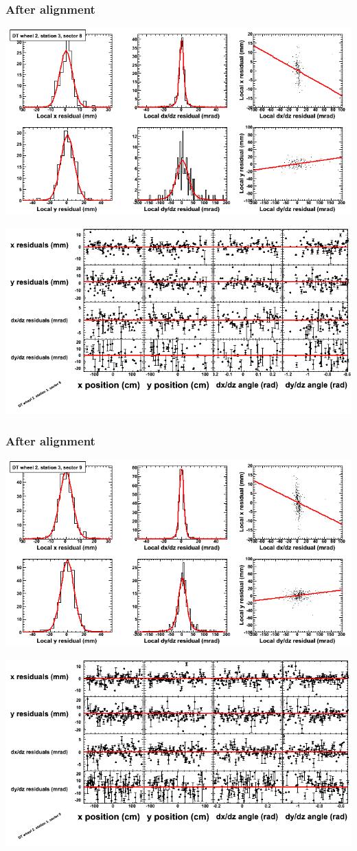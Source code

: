 \documentclass[compress]{beamer}
\begin{document}
\begin{frame}
\frametitle{After alignment}
\includegraphics[width=0.7\linewidth]{NOV4_fitfunctions/MBwhEst3sec08_bellcurves.png}

\includegraphics[width=0.7\linewidth]{NOV4_fitfunctions/MBwhEst3sec08_polynomials.png}
\end{frame}

\begin{frame}
\frametitle{After alignment}
\includegraphics[width=0.7\linewidth]{NOV4_fitfunctions/MBwhEst3sec09_bellcurves.png}

\includegraphics[width=0.7\linewidth]{NOV4_fitfunctions/MBwhEst3sec09_polynomials.png}
\end{frame}
\end{document}
